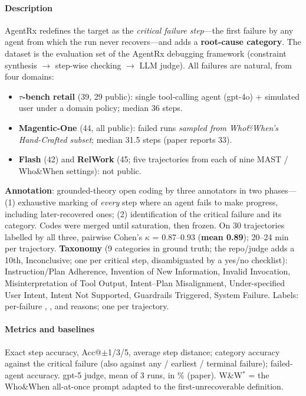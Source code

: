 \paragraph{Description} AgentRx redefines the target as the \emph{critical failure step}---the first failure by any agent from which the run never recovers---and adds a \textbf{root-cause category}. The dataset is the evaluation set of the AgentRx debugging framework (constraint synthesis $\to$ step-wise checking $\to$ LLM judge). All failures are natural, from four domains:
\begin{itemize}
\item \textbf{$\tau$-bench retail} (39, 29 public): single tool-calling agent (gpt-4o) + simulated user under a domain policy; median 36 steps.
\item \textbf{Magentic-One} (44, all public): failed runs \emph{sampled from Who\&When's Hand-Crafted subset}; median 31.5 steps (paper reports 33).
\item \textbf{Flash} (42) and \textbf{RelWork} (45; five trajectories from each of nine MAST / Who\&When settings): not public.
\end{itemize}
\textbf{Annotation}: grounded-theory open coding by three annotators in two phases---(1) exhaustive marking of \emph{every} step where an agent fails to make progress, including later-recovered ones; (2) identification of the critical failure and its category. Codes were merged until saturation, then frozen. On 30 trajectories labelled by all three, pairwise Cohen's $\kappa$ = 0.87--0.93 (\textbf{mean 0.89}); 20--24 min per trajectory. \textbf{Taxonomy} (9 categories in ground truth; the repo/judge adds a 10th, Inconclusive; one per critical step, disambiguated by a yes/no checklist): Instruction/Plan Adherence, Invention of New Information, Invalid Invocation, Misinterpretation of Tool Output, Intent--Plan Misalignment, Under-specified User Intent, Intent Not Supported, Guardrails Triggered, System Failure. Labels: per-failure , ,  and reasons; one  per trajectory.

\paragraph{Metrics and baselines} Exact step accuracy, Acc@$\pm$1/3/5, average step distance; category accuracy against the critical failure (also against any / earliest / terminal failure); failed-agent accuracy. gpt-5 judge, mean of 3 runs, in \% (paper). W\&W$^*$ = the Who\&When all-at-once prompt adapted to the first-unrecoverable definition.

